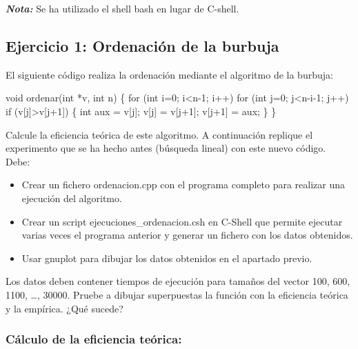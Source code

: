 \documentclass[]{article}
\newenvironment{Shaded}{\begin{snugshade}}{\end{snugshade}}
\newcommand{\KeywordTok}[1]{\textcolor[rgb]{0.94,0.87,0.69}{{#1}}}
\newcommand{\DataTypeTok}[1]{\textcolor[rgb]{0.87,0.87,0.75}{{#1}}}
\newcommand{\DecValTok}[1]{\textcolor[rgb]{0.86,0.86,0.80}{{#1}}}
\newcommand{\NormalTok}[1]{\textcolor[rgb]{0.80,0.80,0.80}{{#1}}}
\begin{document}
\textbf{\emph{Nota:}} Se ha utilizado el shell bash en lugar de C-shell.

\subsection{Ejercicio 1: Ordenación de la
burbuja}\label{ejercicio-1-ordenacion-de-la-burbuja}

El siguiente código realiza la ordenación mediante el algoritmo de la
burbuja:

\begin{Shaded}
\begin{Highlighting}[]
\DataTypeTok{void} \NormalTok{ordenar(}\DataTypeTok{int} \NormalTok{*v, }\DataTypeTok{int} \NormalTok{n) \{}
    \KeywordTok{for} \NormalTok{(}\DataTypeTok{int} \NormalTok{i=}\DecValTok{0}\NormalTok{; i<n}\DecValTok{-1}\NormalTok{; i++)}
        \KeywordTok{for} \NormalTok{(}\DataTypeTok{int} \NormalTok{j=}\DecValTok{0}\NormalTok{; j<n-i}\DecValTok{-1}\NormalTok{; j++)}
            \KeywordTok{if} \NormalTok{(v[j]>v[j}\DecValTok{+1}\NormalTok{]) \{}
                \DataTypeTok{int} \NormalTok{aux = v[j];}
                \NormalTok{v[j] = v[j}\DecValTok{+1}\NormalTok{];}
                \NormalTok{v[j}\DecValTok{+1}\NormalTok{] = aux;}
            \NormalTok{\}}
\NormalTok{\}}
\end{Highlighting}
\end{Shaded}

Calcule la eficiencia teórica de este algoritmo. A continuación replique
el experimento que se ha hecho antes (búsqueda lineal) con este nuevo
código. Debe:

\begin{itemize}
\item
  Crear un fichero ordenacion.cpp con el programa completo para realizar
  una ejecución del algoritmo.
\item
  Crear un script ejecuciones\_ordenacion.csh en C-Shell que permite
  ejecutar varias veces el programa anterior y generar un fichero con
  los datos obtenidos.
\item
  Usar gnuplot para dibujar los datos obtenidos en el apartado previo.
\end{itemize}

Los datos deben contener tiempos de ejecución para tamaños del vector
100, 600, 1100, \ldots{}, 30000. Pruebe a dibujar superpuestas la
función con la eficiencia teórica y la empírica. ¿Qué sucede?

\subsubsection{Cálculo de la eficiencia
teórica:}\label{calculo-de-la-eficiencia-teorica}
\end{document}

